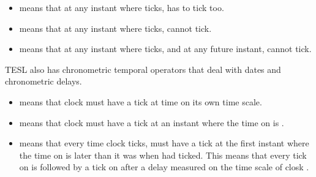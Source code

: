\begin{isabellebody}
\begin{isamarkuptext}
%
\begin{itemize}%
\item {} means that at any instant where  ticks,  has to tick too.

\item {} means that at any instant where  ticks,  cannot tick.

\item {} means that at any instant where  ticks, and at any future instant, 
 cannot tick.%
\end{itemize}%
\end{isamarkuptext}\isamarkuptrue%
%
\isadelimdocument
%
\endisadelimdocument
%
\isatagdocument
%
\isamarkuptrue%
%
\endisatagdocument
{\isafolddocument}%
%
\isadelimdocument
%
\endisadelimdocument
%
\begin{isamarkuptext}%
TESL also has chronometric temporal operators that deal with dates and chronometric delays.

%
\begin{itemize}%
\item {} means that clock  must have a tick at time  on its own time scale.

\item {} means that clock  must have a tick at an instant where the time 
on  is .

\item {} means that every time clock  ticks,  must have 
a tick at the first instant where the time on  is  later than it was when  had ticked.
This means that every tick on  is followed by a tick on  after a delay  measured
on the time scale of closk .


\end{itemize}
\end{isamarkuptext}
\end{isabellebody}
